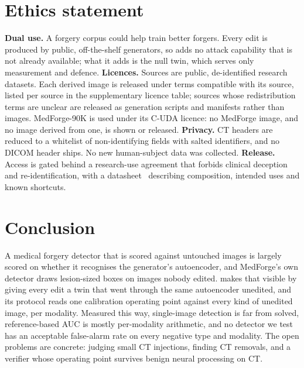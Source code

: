\section*{Ethics statement}
\textbf{Dual use.} A forgery corpus could help train better forgers. Every edit is produced by public, off-the-shelf generators, so \dataset adds no attack capability that is not already available; what it adds is the null twin, which serves only measurement and defence.
\textbf{Licences.} Sources are public, de-identified research datasets. Each derived image is released under terms compatible with its source, listed per source in the supplementary licence table; sources whose redistribution terms are unclear are released as generation scripts and manifests rather than images. 
MedForge-90K is used under its C-UDA licence: no MedForge image, and no image derived from one, is shown or released.
\textbf{Privacy.} CT headers are reduced to a whitelist of non-identifying fields with salted identifiers, and no DICOM header ships. No new human-subject data was collected.
\textbf{Release.} Access is gated behind a research-use agreement that forbids clinical deception and re-identification, with a datasheet~\cite{gebru2021datasheets} describing composition, intended uses and known shortcuts.

\section{Conclusion}
A medical forgery detector that is scored against untouched images is largely scored on whether it recognises the generator's autoencoder, and MedForge's own detector draws lesion-sized boxes on images nobody edited.
\dataset makes that visible by giving every edit a twin that went through the same autoencoder unedited, and its protocol reads one calibration operating point against every kind of unedited image, per modality.
Measured this way, single-image detection is far from solved, reference-based AUC is mostly per-modality arithmetic, and no detector we test has an acceptable false-alarm rate on every negative type and modality.
The open problems are concrete: judging small CT injections, finding CT removals, and a verifier whose operating point survives benign neural processing on CT.
